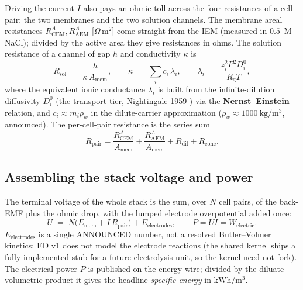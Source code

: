 \documentclass[11pt,a4paper]{article}
\newcommand{\Rgas}{R_{\!\mathrm{g}}}                %
\begin{document}
Driving the current $I$ also pays an ohmic toll across the four
resistances of a cell pair: the two membranes and the two solution
channels.  The membrane areal resistances $R^A_\text{CEM},
R^A_\text{AEM}$ [$\Omega\,\mathrm{m}^2$] come straight from the IEM
 (measured in $0.5$~M NaCl); divided by the active area they
give resistances in ohms.  The solution resistance of a channel of gap
$h$ and conductivity $\kappa$ is
%
\begin{equation}
  R_\text{sol} \;=\; \frac{h}{\kappa\,A_\text{mem}},
  \qquad
  \kappa \;=\; \sum_i c_i\,\lambda_i,
  \qquad
  \lambda_i \;=\; \frac{z_i^2 F^2 D_i^0}{\Rgas T},
  \label{eq:ed-kappa}
\end{equation}
%
where the equivalent ionic conductance $\lambda_i$ is built from the
infinite-dilution diffusivity $D_i^0$ (the  transport
tier, Nightingale 1959 \cite{Nightingale1959}) via the
\textbf{Nernst--Einstein} relation, and $c_i \approx m_i\rho_w$ in the
dilute-carrier approximation ($\rho_w\approx 1000\ \mathrm{kg/m^3}$,
announced).  The per-cell-pair resistance is the series sum
%
\begin{equation}
  R_\text{pair}
    = \frac{R^A_\text{CEM}}{A_\text{mem}}
    + \frac{R^A_\text{AEM}}{A_\text{mem}}
    + R_\text{dil} + R_\text{conc}.
  \label{eq:ed-rpair}
\end{equation}

\subsection{Assembling the stack voltage and power}

The terminal voltage of the whole stack is the sum, over $N$ cell pairs,
of the back-EMF plus the ohmic drop, with the lumped electrode
overpotential added once:
%
\begin{equation}
  U \;=\; N\bigl(E_\text{mem} + I\,R_\text{pair}\bigr)
        + E_\text{electrodes},
  \qquad
  P = U I = W_\text{electric}.
  \label{eq:ed-voltage}
\end{equation}
%
$E_\text{electrodes}$ is a single ANNOUNCED number, not a resolved
Butler--Volmer kinetics: ED v1 does not model the electrode reactions
(the shared  kernel ships a fully-implemented
 stub for a future electrolysis unit, so the kernel
need not fork).  The electrical power $P$ is published on the energy wire;
divided by the diluate volumetric product it gives the headline
\emph{specific energy} in $\mathrm{kWh/m^3}$.
\end{document}
